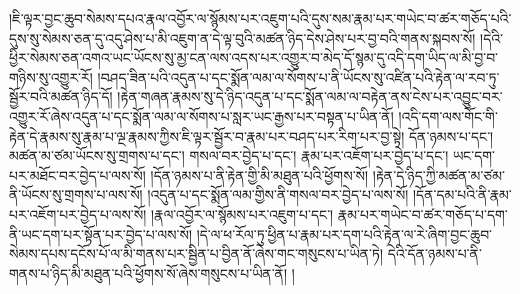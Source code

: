 །ཇི་ལྟར་བྱང་ཆུབ་སེམས་དཔའ་རྣལ་འབྱོར་ལ་སྙོམས་པར་འཇུག་པའི་དུས་སམ་རྣམ་པར་གཡེང་བ་ཚར་གཅོད་པའི་དུས་སུ་སེམས་ཅན་དུ་འདུ་ཤེས་པ་མི་འཇུག་ན་དེ་ལྟ་བུའི་མཚན་ཉིད་དེས་ཤེས་པར་བྱ་བའི་གནས་སྐབས་སོ། །དེའི་ཕྱིར་སེམས་ཅན་འགའ་ཡང་ཡོངས་སུ་མྱ་ངན་ལས་འདས་པར་འགྱུར་བ་མེད་དོ་སྙམ་དུ་འདི་དག་ཡིད་ལ་མི་བྱ་བ་གཉིས་སུ་འགྱུར་རོ། །བཤད་ཟིན་པའི་འདུན་པ་དང་སྨོན་ལམ་ལ་སོགས་པ་ནི་ཡོངས་སུ་འཛིན་པའི་རྟེན་ལ་རབ་ཏུ་སྦྱོར་བའི་མཚན་ཉིད་དོ། །རྟེན་གཞན་རྣམས་སུ་དེ་ཉིད་འདུན་པ་དང་སྨོན་ལམ་ལ་བརྟེན་ནས་ངེས་པར་འབྱུང་བར་འགྱུར་རོ་ཞེས་འདུན་པ་དང་སྨོན་ལམ་ལ་སོགས་པ་སླར་ཡང་རྒྱས་པར་བསྟན་པ་ཡིན་ནོ། །འདི་དག་ལས་གོང་གི་རྟེན་དེ་རྣམས་སུ་རྣམ་པ་ལྔ་རྣམས་ཀྱིས་ཇི་ལྟར་སྦྱོར་བ་རྣམ་པར་བཤད་པར་རིག་པར་བྱ་སྟེ། དོན་ཉམས་པ་དང་། མཚན་མ་ཙམ་ཡོངས་སུ་གྲགས་པ་དང་། གསལ་བར་བྱེད་པ་དང་། རྣམ་པར་འཇོག་པར་བྱེད་པ་དང་། ཡང་དག་པར་མཐོང་བར་བྱེད་པ་ལས་སོ། །དོན་ཉམས་པ་ནི་རྟེན་གྱི་མི་མཐུན་པའི་ཕྱོགས་སོ། །རྟེན་དེ་ཉིད་ཀྱི་མཚན་མ་ཙམ་ནི་ཡོངས་སུ་གྲགས་པ་ལས་སོ། །འདུན་པ་དང་སྨོན་ལམ་གྱིས་ནི་གསལ་བར་བྱེད་པ་ལས་སོ། །དོན་དམ་པའི་ནི་རྣམ་པར་འཇོག་པར་བྱེད་པ་ལས་སོ། །རྣལ་འབྱོར་ལ་སྙོམས་པར་འཇུག་པ་དང་། རྣམ་པར་གཡེང་བ་ཚར་གཅོད་པ་དག་ནི་ཡང་དག་པར་སྟོན་པར་བྱེད་པ་ལས་སོ། །དེ་ལ་ཕ་རོལ་ཏུ་ཕྱིན་པ་རྣམ་པར་དག་པའི་རྟེན་ལ་རེ་ཞིག་བྱང་ཆུབ་སེམས་དཔས་དངོས་པོ་ལ་མི་གནས་པར་སྦྱིན་པ་བྱིན་ནོ་ཞེས་གང་གསུངས་པ་ཡིན་ཏེ། དེའི་དོན་ཉམས་པ་ནི་གནས་པ་ཉིད་མི་མཐུན་པའི་ཕྱོགས་སོ་ཞེས་གསུངས་པ་ཡིན་ནོ། །
